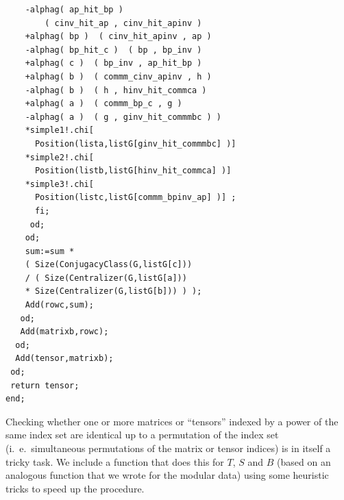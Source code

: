 \documentclass[11pt]{book}
\theoremstyle{Rem}
\theoremstyle{definition}
\numberwithin{equation}{section}
\begin{document}
\begin{lstlisting}
	-alphag( ap_hit_bp )  
	    ( cinv_hit_ap , cinv_hit_apinv ) 
	+alphag( bp )  ( cinv_hit_apinv , ap ) 
	-alphag( bp_hit_c )  ( bp , bp_inv )  
	+alphag( c )  ( bp_inv , ap_hit_bp )  
	+alphag( b )  ( commm_cinv_apinv , h )  
	-alphag( b )  ( h , hinv_hit_commca )  
	+alphag( a )  ( commm_bp_c , g )  
	-alphag( a )  ( g , ginv_hit_commmbc ) ) 
	*simple1!.chi[ 
	  Position(lista,listG[ginv_hit_commmbc] )]   
	*simple2!.chi[ 
	  Position(listb,listG[hinv_hit_commca] )]  
	*simple3!.chi[ 
	  Position(listc,listG[commm_bpinv_ap] )] ;
      fi;
     od;
    od;
    sum:=sum * 
    ( Size(ConjugacyClass(G,listG[c])) 
    / ( Size(Centralizer(G,listG[a])) 
    * Size(Centralizer(G,listG[b])) ) );
    Add(rowc,sum);
   od;
   Add(matrixb,rowc);
  od;
  Add(tensor,matrixb);
 od;
 return tensor;
end;
\end{lstlisting}
Checking whether one or more matrices or ``tensors'' indexed by a power of the same index set are identical up to a permutation of the index set (i.~e.\ simultaneous permutations of the matrix or tensor indices) is in itself a tricky task. We include a function that does this for  $T$, $S$ and $B$ (based on an analogous function that we wrote for the modular data) using some heuristic tricks to speed up the procedure.
\end{document}
